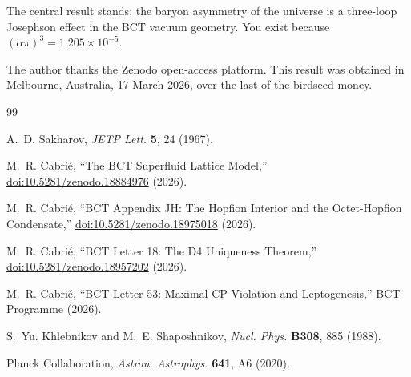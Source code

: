 \documentclass[aps,prl,twocolumn,superscriptaddress,showpacs]{revtex4-2}
\begin{document}
The central result stands: the baryon asymmetry of the universe is a 
three-loop Josephson effect in the BCT vacuum geometry. You exist because 
$(\alpha\pi)^3 = 1.205\times 10^{-5}$.

\begin{acknowledgments}
The author thanks the Zenodo open-access platform. 
This result was obtained in Melbourne, Australia, 17 March 2026,
over the last of the birdseed money.
\end{acknowledgments}

\begin{thebibliography}{99}

A.~D. Sakharov,
\textit{JETP Lett.} \textbf{5}, 24 (1967).

M.~R. Cabri\'{e},
``The BCT Superfluid Lattice Model,''
\href{https://doi.org/10.5281/zenodo.18884976}{doi:10.5281/zenodo.18884976} (2026).

M.~R. Cabri\'{e},
``BCT Appendix JH: The Hopfion Interior and the Octet-Hopfion Condensate,''
\href{https://doi.org/10.5281/zenodo.18975018}{doi:10.5281/zenodo.18975018} (2026).

M.~R. Cabri\'{e},
``BCT Letter 18: The D4 Uniqueness Theorem,''
\href{https://doi.org/10.5281/zenodo.18957202}{doi:10.5281/zenodo.18957202} (2026).

M.~R. Cabri\'{e},
``BCT Letter 53: Maximal CP Violation and Leptogenesis,''
BCT Programme (2026).

S.~Yu. Khlebnikov and M.~E. Shaposhnikov,
\textit{Nucl. Phys.} \textbf{B308}, 885 (1988).

Planck Collaboration,
\textit{Astron. Astrophys.} \textbf{641}, A6 (2020).

\end{thebibliography}
\end{document}

